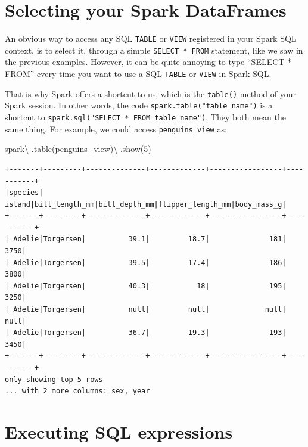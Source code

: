 \documentclass[
  11pt,
  letterpaper,
  DIV=11,
  numbers=noendperiod]{scrreprt}
\newenvironment{Shaded}{\begin{snugshade}}{\end{snugshade}}
\newcommand{\DecValTok}[1]{\textcolor[rgb]{0.68,0.00,0.00}{#1}}
\newcommand{\NormalTok}[1]{\textcolor[rgb]{0.00,0.23,0.31}{#1}}
\newcommand{\OperatorTok}[1]{\textcolor[rgb]{0.37,0.37,0.37}{#1}}
\newcommand{\StringTok}[1]{\textcolor[rgb]{0.13,0.47,0.30}{#1}}
\begin{document}
\hypertarget{selecting-your-spark-dataframes}{%
\section{Selecting your Spark
DataFrames}\label{selecting-your-spark-dataframes}}

An obvious way to access any SQL \texttt{TABLE} or \texttt{VIEW}
registered in your Spark SQL context, is to select it, through a simple
\texttt{SELECT\ *\ FROM} statement, like we saw in the previous
examples. However, it can be quite annoying to type ``SELECT * FROM''
every time you want to use a SQL \texttt{TABLE} or \texttt{VIEW} in
Spark SQL.

That is why Spark offers a shortcut to us, which is the \texttt{table()}
method of your Spark session. In other words, the code
\texttt{spark.table("table\_name")} is a shortcut to
\texttt{spark.sql("SELECT\ *\ FROM\ table\_name")}. They both mean the
same thing. For example, we could access \texttt{penguins\_view} as:

\begin{Shaded}
\begin{Highlighting}[]
\NormalTok{spark}\OperatorTok{\textbackslash{}}
\NormalTok{  .table(}\StringTok{\textquotesingle{}penguins\_view\textquotesingle{}}\NormalTok{)}\OperatorTok{\textbackslash{}}
\NormalTok{  .show(}\DecValTok{5}\NormalTok{)}
\end{Highlighting}
\end{Shaded}

\begin{verbatim}
+-------+---------+--------------+-------------+-----------------+-----------+
|species|   island|bill_length_mm|bill_depth_mm|flipper_length_mm|body_mass_g|
+-------+---------+--------------+-------------+-----------------+-----------+
| Adelie|Torgersen|          39.1|         18.7|              181|       3750|
| Adelie|Torgersen|          39.5|         17.4|              186|       3800|
| Adelie|Torgersen|          40.3|           18|              195|       3250|
| Adelie|Torgersen|          null|         null|             null|       null|
| Adelie|Torgersen|          36.7|         19.3|              193|       3450|
+-------+---------+--------------+-------------+-----------------+-----------+
only showing top 5 rows
... with 2 more columns: sex, year
\end{verbatim}

\hypertarget{executing-sql-expressions}{%
\section{Executing SQL expressions}\label{executing-sql-expressions}}
\end{document}
